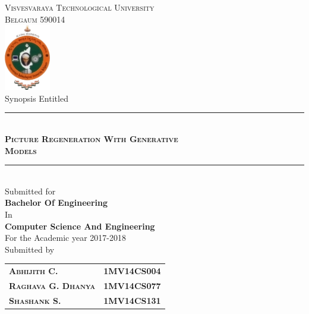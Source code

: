 

\begin{titlepage} %
	\newcommand{\HRule}{\rule{\linewidth}{0.5mm}} %

	\center %

	\textsc{\LARGE Visvesvaraya Technological University\\[2pt]Belgaum 590014}\\[10pt] 
	\includegraphics[width=0.15\textwidth]{vtu.png}\\[10pt] 

	{\Large Synopsis Entitled}\\[10pt] %


	\HRule\\[10pt]
	\textsc{\huge \textbf{Picture Regeneration With Generative}\\[2pt] \textbf{Models}}\\[10pt]

	\HRule\\[10pt]
	\Large{
		Submitted for\\
		\textbf{Bachelor Of Engineering}\\
		In \\
		\textbf{Computer Science And Engineering} \\
		For the Academic year 2017-2018 
	}\\[15pt]
	\Large{Submitted by}\\[2pt]
	\begin{tabular}{ l r }
		\textsc{\Large \textbf{Abhijith C.}}       & \Large \textbf{1MV14CS004} \\
		\textsc{\Large \textbf{Raghava G. Dhanya}} & \Large \textbf{1MV14CS077} \\
		\textsc{\Large \textbf{Shashank S.}}       & \Large \textbf{1MV14CS131}
	\end{tabular}\\[15pt]


\end{titlepage}
